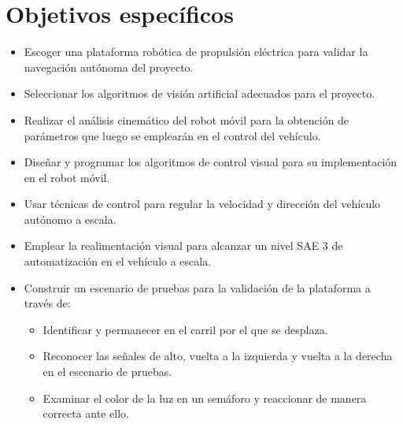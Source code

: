 \documentclass[12pt, letterpaper, oneside]{book}
\begin{document}
	\section*{Objetivos específicos}
	\label{sec:obje}
	\begin{itemize}
		\item Escoger una plataforma robótica de propulsión eléctrica para validar la navegación autónoma del proyecto.
		\item Seleccionar los algoritmos de visión artificial adecuados para el proyecto.
		\item Realizar el análisis cinemático del robot móvil para la obtención de parámetros que luego se emplearán en el control del vehículo.
		\item Diseñar y programar los algoritmos de control visual para su implementación en el robot móvil.
		\item Usar técnicas de control para regular la velocidad y dirección del vehículo autónomo a escala.
		\item Emplear la realimentación visual para alcanzar un nivel SAE 3 de automatización\cite{saeTaxonomyDefinitiosTerms2014} en el vehículo a escala.
		\item Construir un escenario de pruebas para la validación de la plataforma a través de:
		\begin{itemize}
			\item Identificar y permanecer en el carril por el que se desplaza.
			\item Reconocer las señales  de alto, vuelta a la izquierda y vuelta a la derecha en el escenario de pruebas.
			\item Examinar el color de la luz en un semáforo y reaccionar de manera correcta ante ello.	
		\end{itemize}
	\end{itemize}
\end{document}

